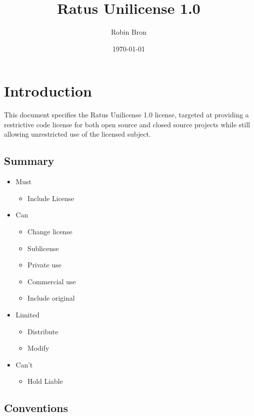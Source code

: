 \documentclass[a4paper,11pt]{article}
\begin{document}
\title{Ratus Unilicense 1.0}
\author{Robin Bron}
\date{\today}
\maketitle

\vfill


\newpage
\tableofcontents
\newpage

\section{Introduction}
  This document specifies the Ratus Unilicense 1.0 license, targeted at
  providing a restrictive code license for both open source and closed source
  projects while still allowing unrestricted use of the licensed subject.

\subsection{Summary}
  \begin{itemize}
    \item Must
    \begin{itemize}
      \item Include License
    \end{itemize}
    \item Can
    \begin{itemize}
      \item Change license
      \item Sublicense
      \item Private use
      \item Commercial use
      \item Include original
    \end{itemize}
    \item Limited
    \begin{itemize}
      \item Distribute
      \item Modify
    \end{itemize}
    \item Can't
    \begin{itemize}
      \item Hold Liable
    \end{itemize}
  \end{itemize}

\subsection{Conventions}

\end{document}
